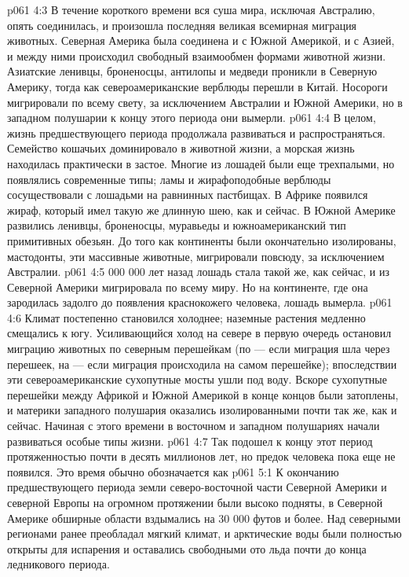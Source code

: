 \vs p061 4:3 В течение короткого времени вся суша мира, исключая Австралию, опять соединилась, и произошла последняя великая всемирная миграция животных. Северная Америка была соединена и с Южной Америкой, и с Азией, и между ними происходил свободный взаимообмен формами животной жизни. Азиатские ленивцы, броненосцы, антилопы и медведи проникли в Северную Америку, тогда как североамериканские верблюды перешли в Китай. Носороги мигрировали по всему свету, за исключением Австралии и Южной Америки, но в западном полушарии к концу этого периода они вымерли.
\vs p061 4:4 В целом, жизнь предшествующего периода продолжала развиваться и распространяться. Семейство кошачьих доминировало в животной жизни, а морская жизнь находилась практически в застое. Многие из лошадей были еще трехпалыми, но появлялись современные типы; ламы и жирафоподобные верблюды сосуществовали с лошадьми на равнинных пастбищах. В Африке появился жираф, который имел такую же длинную шею, как и сейчас. В Южной Америке развились ленивцы, броненосцы, муравьеды и южноамериканский тип примитивных обезьян. До того как континенты были окончательно изолированы, мастодонты, эти массивные животные, мигрировали повсюду, за исключением Австралии.
\vs p061 4:5  000 000 лет назад лошадь стала такой же, как сейчас, и из Северной Америки мигрировала по всему миру. Но на континенте, где она зародилась задолго до появления краснокожего человека, лошадь вымерла.
\vs p061 4:6 Климат постепенно становился холоднее; наземные растения медленно смещались к югу. Усиливающийся холод на севере в первую очередь остановил миграцию животных по северным перешейкам (по --- если миграция шла через перешеек, на --- если миграция происходила на самом перешейке); впоследствии эти североамериканские сухопутные мосты ушли под воду. Вскоре сухопутные перешейки между Африкой и Южной Америкой в конце концов были затоплены, и материки западного полушария оказались изолированными почти так же, как и сейчас. Начиная с этого времени в восточном и западном полушариях начали развиваться особые типы жизни.
\vs p061 4:7 \pc Так подошел к концу этот период протяженностью почти в десять миллионов лет, но предок человека пока еще не появился. Это время обычно обозначается как 
\vs p061 5:1 К окончанию предшествующего периода земли северо\hyp{}восточной части Северной Америки и северной Европы на огромном протяжении были высоко подняты, в Северной Америке обширные области вздымались на 30 000 футов и более. Над северными регионами ранее преобладал мягкий климат, и арктические воды были полностью открыты для испарения и оставались свободными ото льда почти до конца ледникового периода.
